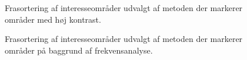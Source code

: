 \begin{figure}[htbp]
  \centering
  \begin{minipage}[b]{5 cm}
  \end{minipage}
  \begin{minipage}[b]{5 cm}
  \end{minipage}
  \caption{Frasortering af interesseområder udvalgt af metoden der markerer områder med høj kontrast.}
   \label{fig:DetectContrastAvg-cleanup}
\end{figure}

\begin{figure}[htbp]
  \centering
  \begin{minipage}[b]{5 cm}
  \end{minipage}
  \begin{minipage}[b]{5 cm}
  \end{minipage}
  \caption{Frasortering af interesseområder udvalgt af metoden der markerer områder på baggrund af frekvensanalyse.}
   \label{fig:DetectPlateness-cleanup}
\end{figure}

